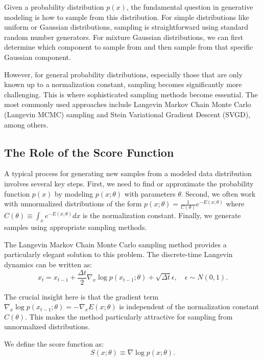 Given a probability distribution $p(x)$, the fundamental question in generative modeling is how to sample from this distribution. For simple distributions like uniform or Gaussian distributions, sampling is straightforward using standard random number generators. For mixture Gaussian distributions, we can first determine which component to sample from and then sample from that specific Gaussian component.

However, for general probability distributions, especially those that are only known up to a normalization constant, sampling becomes significantly more challenging. This is where sophisticated sampling methods become essential. The most commonly used approaches include Langevin Markov Chain Monte Carlo (Langevin MCMC) sampling and Stein Variational Gradient Descent (SVGD), among others.

\subsection{The Role of the Score Function}

A typical process for generating new samples from a modeled data distribution involves several key steps. First, we need to find or approximate the probability function $p(x)$ by modeling $p(x;\theta)$ with parameters $\theta$. Second, we often work with unnormalized distributions of the form $p(x;\theta) = \frac{1}{C(\theta)}e^{-E(x;\theta)}$ where $C(\theta) \equiv \int_x e^{-E(x;\theta)}dx$ is the normalization constant. Finally, we generate samples using appropriate sampling methods.

The Langevin Markov Chain Monte Carlo sampling method provides a particularly elegant solution to this problem. The discrete-time Langevin dynamics can be written as:
\begin{equation}
x_t = x_{t-1} + \frac{\Delta t}{2}\nabla_x\log p(x_{t-1};\theta) + \sqrt{\Delta t}\epsilon, \quad \epsilon\sim N(0, 1).
\end{equation}

The crucial insight here is that the gradient term $\nabla_x\log p(x_{t-1};\theta) = -\nabla_x E(x;\theta)$ is independent of the normalization constant $C(\theta)$. This makes the method particularly attractive for sampling from unnormalized distributions.

We define the score function as:
\begin{equation}
S(x;\theta) \equiv \nabla \log p(x;\theta).
\end{equation}

